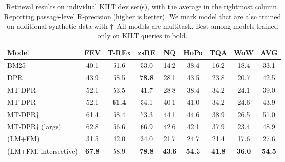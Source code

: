 \begin{table*}[ht]
\footnotesize
\setlength{\tabcolsep}{5pt}
\centering
\begin{tabular}{lSSSSSSS|S}
\toprule
\textbf{Model}        & {\textbf{FEV}}  & {\textbf{T-REx}} & {\textbf{zsRE}} & {\textbf{NQ}}   & {\textbf{HoPo}} & {\textbf{TQA}}  & {\textbf{WoW}}  & {\textbf{AVG}}  \\ \midrule
BM25                & 40.1 & 51.6  & 53.0 & 14.2 & 38.4 & 16.2 & 18.4 & 33.1 \\
DPR \cite{maillard-etal-2021-multi}          & 43.9 & 58.5  & \bfseries 78.8 & 28.1 & 43.5 & 23.8 & 20.7 & 42.5 \\
MT-DPR \citep{maillard-etal-2021-multi}       & 52.1 & 53.5  & 41.7 & 28.8 & 38.4 & 34.2 & 24.1 & 39.0 \\
MT-DPR \citep{oguz-etal-2021-domain}      & 52.1 & \bfseries 61.4  & 54.1 & 40.1 & 41.0 & 34.2 & 24.6 & 43.9 \\ \midrule
MT-DPR$\dag$ \citep{oguz-etal-2021-domain}                      & 61.4 & 68.4  & 73.3 & 44.1 & 44.6 & 38.9 & 26.5 & 51.0 \\
MT-DPR$\dag$ (large) \citep{oguz-etal-2021-domain}     & 62.8 & 66.6  & 66.9 & 42.6 & 42.1 & 37.9 & 23.4 & 48.9 \\ \midrule

\system{} (LM+FM)   & 31.5 & 42.0 & 34.0 & 21.7 & 24.7 & 21.4 & 17.6 & 27.6 \\ 
\system{} (LM+FM, intersective)   & \bfseries 67.8 & 58.9 & \bfseries 78.8 & \bfseries 43.6 & \bfseries 54.3 & \bfseries 41.8 & \bfseries 36.0 & \bfseries 54.5 \\
\bottomrule

\end{tabular}
\caption{Retrieval results on individual KILT dev set(s), with the average in the rightmost column. Reporting passage-level R-precision (higher is better). We mark model that are also trained on additional synthetic data \citep{lewis-etal-2021-paq} with $\dag$. All \system{} models are multitask. Best among models trained only on KILT queries in bold.}
\label{tab:kilt-dev-rp}
\end{table*}